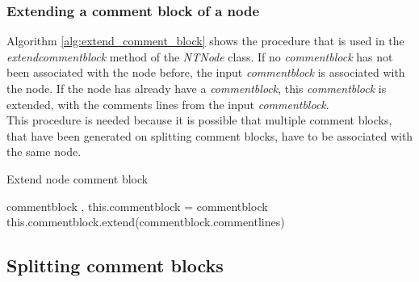 \subsubsection{Extending a comment block of a node}\label{sec:ImplementationMaintainingExtendCommentBlock}

Algorithm \ref{alg:extend_comment_block} shows the procedure that is used in the \textit{extend\textunderscore comment\textunderscore block} method of the \textit{NTNode} class.
If no \textit{comment\textunderscore block} has not been associated with the node before, the input \textit{comment\textunderscore block} is associated with the node.
If the node has already have a \textit{comment\textunderscore block}, this \textit{comment\textunderscore block} is extended, with the comments lines from the input \textit{comment\textunderscore block}.\\
This procedure is needed because it is possible that multiple comment blocks, that have been generated on splitting comment blocks, have to be associated with the same node.

\begin{algorithm}[H]
\small
\caption{Extend node comment block}
\begin{algorithmic}[1]
\algrenewcommand\algorithmicindent{0.4em}
\Require comment\textunderscore block
‚
	\State this.comment\textunderscore block = comment\textunderscore block
\Else
	\State this.comment\textunderscore block.extend(comment\textunderscore block.comment\textunderscore lines)
\EndIf
\end{algorithmic}
\label{alg:extend_comment_block}
\end{algorithm}


\subsection{Splitting comment blocks}\label{sec:ImplementationMaintainingCommentsSplitByTop}


